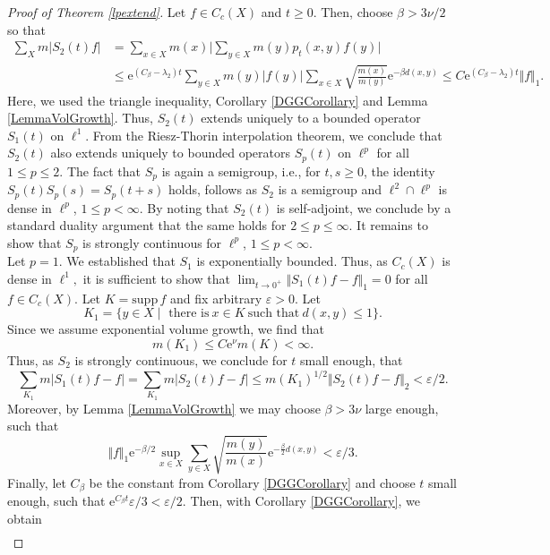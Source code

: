 \documentclass[10pt,a4paper]{amsart}
\begin{document}
\begin{proof}[Proof of Theorem \ref{lpextend}]
    Let $ f\in C_c(X)$ and $t\geq 0.$ Then, choose $\beta>3\nu\slash 2$ so that
    \begin{align*}
        \sum_ X m\vert S_2(t) f\vert &= \sum_{x\in X} m(x)\Big\vert\sum_{y\in X}m(y)p_t(x,y) f(y)\Big\vert\\
        &\leq \mathrm{e}^{(C_\beta-\lambda_2) t}\sum_{y\in X} m(y)\vert f(y)\vert\sum_{x\in X}\sqrt{\frac{m(x)}{m(y)}}\mathrm{e}^{-\beta d(x,y)}\leq C\mathrm{e}^{(C_\beta-\lambda_2) t}\Vert f\Vert_1.
    \end{align*}
Here, we used the triangle inequality, Corollary \ref{DGGCorollary} and Lemma \ref{LemmaVolGrowth}. Thus, $S_2(t)$ extends uniquely to a bounded operator $S_1(t)$ on $\ell^1.$ From the Riesz-Thorin interpolation theorem,  we conclude that $S_2(t)$ also extends uniquely to bounded operators $S_p(t)$ on $\ell^p$ for all $1\leq p\leq 2.$ The fact that $S_p$ is again a semigroup, i.e., for $t,s\geq 0$, the identity $S_p(t)S_p(s) = S_p(t+s)$ holds, follows as $S_2$ is a semigroup and $\ell^2\cap\ell^p$ is dense in $\ell^p$, $1\le p<\infty$. By noting that $S_2(t)$ is self-adjoint, we conclude by a standard duality argument that the same holds for $2\leq p\leq \infty.$  It remains to show that $S_p$ is strongly continuous for $\ell^p$, $1\le p<\infty$. \\
Let $p = 1.$ We established that $S_1$ is exponentially bounded. Thus, as $C_c(X)$ is dense in $\ell^1,$ it is sufficient to show that $\lim_{t\rightarrow0^+}\Vert S_1(t)f-f\Vert_1 = 0$ for all $f\in C_c(X).$ Let $K = \mathrm{supp}\,f$ and fix arbitrary $\varepsilon >0.$ Let 
\[K_1 = \lbrace y\in X\mid \text{ there is}~x\in K~\text{such that}~d(x,y)\leq1\rbrace.\]  
Since we assume exponential volume growth, we find that 
\[m(K_1 )\leq C\mathrm{e}^{\nu}m(K)<\infty.\] Thus, as $S_2$ is strongly continuous, we conclude for $t$ small enough, that 
\[\sum_{K_1}m\vert S_1(t)f-f\vert = \sum_{K_1}m\vert S_2(t)f-f\vert\leq m(K_1)^{1\slash 2}\Vert S_2(t)f-f\Vert_2<\varepsilon\slash 2.\] 
Moreover, by Lemma \ref{LemmaVolGrowth} we may choose  $\beta>3\nu$ large enough, such that 
\[\Vert f\Vert_1\mathrm{e}^{-\beta\slash 2}\sup_{x\in X}\sum_{y\in X}\sqrt{\frac{m(y)}{m(x)}}\mathrm{e}^{-\frac{\beta}{2} d(x,y)}<\varepsilon\slash 3.\]
Finally, let $C_\beta$ be the constant from Corollary \ref{DGGCorollary} and choose $t$ small enough, such that $\mathrm{e}^{C_\beta t}\varepsilon\slash 3<\varepsilon\slash 2.$ Then, with  Corollary \ref{DGGCorollary}, we obtain
\begin{align*}

\end{align*}
\end{proof}
\end{document}

